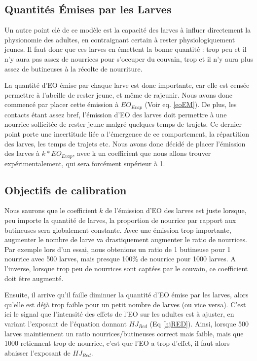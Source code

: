 	
	
	\subsection{Quantités Émises par les Larves}
	Un autre point clé de ce modèle est la capacité des larves à influer directement la physionomie des adultes, en contraignant certain à rester physiologiquement jeunes. Il faut donc  que ces larves en émettent la bonne quantité : trop peu et il n'y aura pas assez de nourrices pour s'occuper du couvain, trop et il n'y aura plus assez de butineuses à la récolte de nourriture.
	
	La quantité d'EO émise par chaque larve est donc importante, car elle est censée permettre à l'abeille de rester jeune, et même de rajeunir. Nous avons donc commencé par placer cette émission à $EO_{Evap}$ (Voir eq. \ref{eoEM}). De plus, les contacts étant assez bref, l'émission d'EO des larves doit permettre à une nourrice sollicitée de rester jeune malgré quelques temps de trajets. Ce dernier point porte une incertitude liée a l'émergence de ce comportement, la répartition des larves, les temps de trajets etc. Nous avons donc décidé de placer l'émission des larves à $k * EO_{Evap}$, avec k un coefficient que nous allons trouver expérimentalement, qui sera forcément supérieur à 1.
	
	\subsection{Objectifs de calibration}
	Nous saurons que le coefficient $k$ de l'émission d'EO des larves est juste lorsque, peu importe la quantité de larves, la proportion de nourrice par rapport aux butineuses sera globalement constante. Avec une émission trop importante, augmenter le nombre de larve va drastiquement augmenter le ratio de nourrices. Par exemple lors d'un essai, nous obtenions un ratio de 1 butineuse pour 1 nourrice avec 500 larves, mais presque 100\% de nourrice pour 1000 larves. A l'inverse, lorsque trop peu de nourrices sont captées par le couvain, ce coefficient doit être augmenté.
	
	Ensuite, il arrive qu'il faille diminuer la quantité d'EO émise par les larves, alors qu'elle est déjà trop faible pour un petit nombre de larves (ou vice versa). C'est ici le signal que l'intensité des effets de l'EO sur les adultes est à ajuster, en variant l'exposant de l'équation donnant $HJ_{Red}$ (Eq \ref{hjRED}). Ainsi, lorsque 500 larves maintiennent un ratio nourrices/butineuses correct mais faible, mais que 1000 retiennent trop de nourrice, c'est que l'EO a trop d'effet, il faut alors abaisser l'exposant de $HJ_{Red}$. 
	
